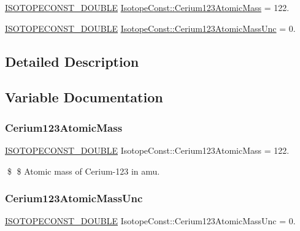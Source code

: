 \begin{DoxyCompactItemize}
\item 
\mbox{\hyperlink{group___isotope_const-_macros_ga8f45a7272ce02c0b4c65c44636ed719a}{I\+S\+O\+T\+O\+P\+E\+C\+O\+N\+S\+T\+\_\+\+D\+O\+U\+B\+LE}} \mbox{\hyperlink{group___isotope_const-_cerium-_ce123_gae43bb2269b2b3a8fcfdff9b3690354c2}{Isotope\+Const\+::\+Cerium123\+Atomic\+Mass}} = 122.
\item 
\mbox{\hyperlink{group___isotope_const-_macros_ga8f45a7272ce02c0b4c65c44636ed719a}{I\+S\+O\+T\+O\+P\+E\+C\+O\+N\+S\+T\+\_\+\+D\+O\+U\+B\+LE}} \mbox{\hyperlink{group___isotope_const-_cerium-_ce123_ga3ad0534888ae1dbabf03771787394200}{Isotope\+Const\+::\+Cerium123\+Atomic\+Mass\+Unc}} = 0.
\end{DoxyCompactItemize}


\subsection{Detailed Description}


\subsection{Variable Documentation}
\mbox{\label{group___isotope_const-_cerium-_ce123_gae43bb2269b2b3a8fcfdff9b3690354c2}} 
\subsubsection{\texorpdfstring{Cerium123\+Atomic\+Mass}{Cerium123AtomicMass}}
{\footnotesize\ttfamily \mbox{\hyperlink{group___isotope_const-_macros_ga8f45a7272ce02c0b4c65c44636ed719a}{I\+S\+O\+T\+O\+P\+E\+C\+O\+N\+S\+T\+\_\+\+D\+O\+U\+B\+LE}} Isotope\+Const\+::\+Cerium123\+Atomic\+Mass = 122.}

\$ \$ Atomic mass of Cerium-\/123 in amu. \mbox{\label{group___isotope_const-_cerium-_ce123_ga3ad0534888ae1dbabf03771787394200}} 
\subsubsection{\texorpdfstring{Cerium123\+Atomic\+Mass\+Unc}{Cerium123AtomicMassUnc}}
{\footnotesize\ttfamily \mbox{\hyperlink{group___isotope_const-_macros_ga8f45a7272ce02c0b4c65c44636ed719a}{I\+S\+O\+T\+O\+P\+E\+C\+O\+N\+S\+T\+\_\+\+D\+O\+U\+B\+LE}} Isotope\+Const\+::\+Cerium123\+Atomic\+Mass\+Unc = 0.}

